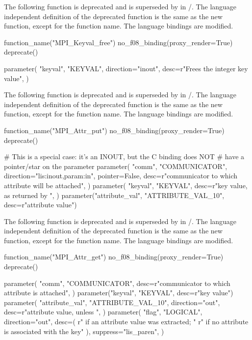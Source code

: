 \deprecatedsep
The following function is deprecated and is superseded by  in \mpiiidoto/. 
The language independent definition 
of the deprecated function is the same as the new function,
except for the function name. 
The language bindings are modified.

\begin{mpi-binding}
    function_name("MPI_Keyval_free")
    no_f08_binding(proxy_render=True)
    deprecate()
    
    parameter(
        "keyval",
        "KEYVAL",
        direction="inout",
        desc=r"Frees the integer key value",
    )
\end{mpi-binding}


\deprecatedsep
The following function is deprecated and is superseded by  in \mpiiidoto/. 
The language independent definition 
of the deprecated function is the same as the new function,
except for the function name. 
The language bindings are modified.

\begin{mpi-binding}
    function_name("MPI_Attr_put")
    no_f08_binding(proxy_render=True)
    deprecate()
    
    # This is a special case: it's an INOUT, but the C binding does NOT
    # have a pointer/star on the parameter
    parameter(
        "comm",
        "COMMUNICATOR",
        direction="lis:inout,param:in",
        pointer=False,
        desc=r"communicator to which attribute will be attached",
    )
    parameter(
        "keyval",
        "KEYVAL",
        desc=r"key value, as returned by ",
    )
    parameter("attribute_val", "ATTRIBUTE_VAL_10", desc=r"attribute value")
\end{mpi-binding}

\deprecatedsep
The following function is deprecated and is superseded by  in \mpiiidoto/. 
The language independent definition 
of the deprecated function is the same as the new function,
except for the function name. 
The language bindings are modified.

\begin{mpi-binding}
    function_name("MPI_Attr_get")
    no_f08_binding(proxy_render=True)
    deprecate()
    
    parameter(
        "comm",
        "COMMUNICATOR",
        desc=r"communicator to which attribute is attached",
    )
    parameter("keyval", "KEYVAL", desc=r"key value")
    parameter(
        "attribute_val",
        "ATTRIBUTE_VAL_10",
        direction="out",
        desc=r"attribute value, unless  ",
    )
    parameter(
        "flag",
        "LOGICAL",
        direction="out",
        desc=(
            r" if an attribute value was extracted; "
            r" if no attribute is associated with the key"
        ),
        suppress="lis_paren",
    )
\end{mpi-binding}


